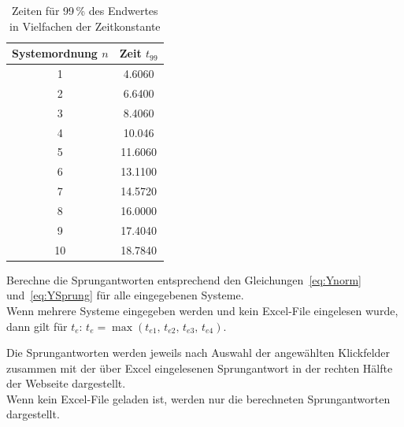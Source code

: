 \documentclass[main.tex]{subfiles}
\begin{document}
\begin{table}[H]
    \centering
    \begin{tabular}{|c|c|}
      \hline
         Systemordnung $n$ & Zeit $t_{99}$  \\
         \hline
        1  & 4.6060  \\
         \hline
        2  & 6.6400  \\
         \hline
        3  & 8.4060  \\
         \hline
        4  & 10.046  \\
         \hline
        5  & 11.6060  \\
         \hline
        6  & 13.1100  \\
         \hline
        7  & 14.5720  \\
         \hline
        8  & 16.0000  \\
         \hline
        9  & 17.4040  \\
         \hline
        10 & 18.7840  \\
         \hline
    \end{tabular}
    \caption{Zeiten für 99\,\% des Endwertes in Vielfachen der Zeitkonstante}
    \label{tab:99Prozent}
\end{table}

Berechne die Sprungantworten entsprechend den Gleichungen~\ref{eq:Ynorm} und~\ref{eq:YSprung} für alle eingegebenen Systeme.\\
Wenn mehrere Systeme eingegeben werden und kein Excel-File eingelesen wurde, dann gilt für $t_e$: $t_e = \max(t_{e1},\, t_{e2},\, t_{e3},\, t_{e4})$.  %

Die Sprungantworten werden jeweils nach Auswahl der angewählten Klickfelder  %
zusammen mit der über Excel eingelesenen Sprungantwort in der rechten Hälfte der Webseite dargestellt.\\
Wenn kein Excel-File geladen ist, werden nur die berechneten Sprungantworten dargestellt.\\
\end{document}
